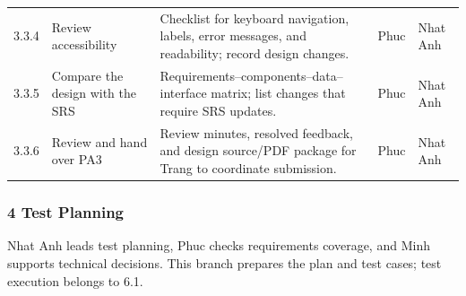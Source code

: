 \documentclass[11pt]{article}
\renewcommand{\arraystretch}{1.18}
\begin{document}
\begin{longtable}{@{}L{1.15cm}L{3.2cm}L{7.6cm}L{1.4cm}L{1.4cm}@{}}
3.3.4 & Review accessibility & Checklist for keyboard navigation, labels, error messages, and readability; record design changes. & Phuc & Nhat Anh \\
3.3.5 & Compare the design with the SRS & Requirements--components--data--interface matrix; list changes that require SRS updates. & Phuc & Nhat Anh \\
3.3.6 & Review and hand over PA3 & Review minutes, resolved feedback, and design source/PDF package for Trang to coordinate submission. & Phuc & Nhat Anh \\
\bottomrule\end{longtable}\normalsize\setlength{\tabcolsep}{3pt}\renewcommand{\arraystretch}{1.18}

\subsubsection*{4 Test Planning}
Nhat Anh leads test planning, Phuc checks requirements coverage, and Minh supports technical decisions. This branch prepares the plan and test cases; test execution belongs to 6.1.
\footnotesize\setlength{\tabcolsep}{2.5pt}\renewcommand{\arraystretch}{1.08}
\end{document}
